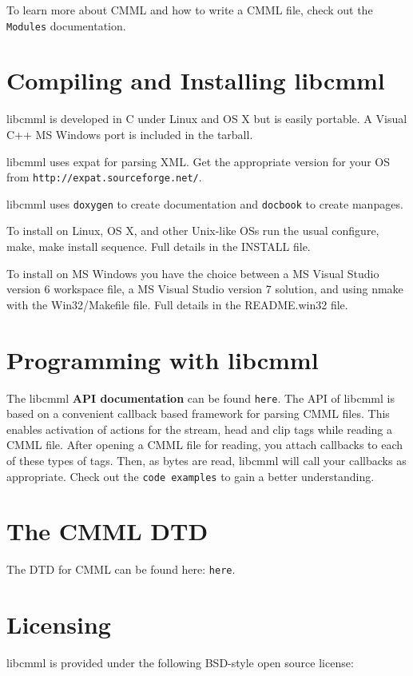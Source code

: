 To learn more about CMML and how to write a CMML file, check out the {\tt Modules} documentation.\section{Compiling and Installing libcmml}\label{install}
libcmml is developed in C under Linux and OS X but is easily portable. A Visual C++ MS Windows port is included in the tarball.

libcmml uses expat for parsing XML. Get the appropriate version for your OS from {\tt http://expat.sourceforge.net/}.

libcmml uses {\tt doxygen} to create documentation and {\tt docbook} to create manpages.

To install on Linux, OS X, and other Unix-like OSs run the usual configure, make, make install sequence. Full details in the INSTALL file.

To install on MS Windows you have the choice between a MS Visual Studio version 6 workspace file, a MS Visual Studio version 7 solution, and using nmake with the Win32/Makefile file. Full details in the README.win32 file.\section{Programming with libcmml}\label{begin}
The libcmml {\bf API documentation} can be found {\tt here}. The API of libcmml is based on a convenient callback based framework for parsing CMML files. This enables activation of actions for the stream, head and clip tags while reading a CMML file. After opening a CMML file for reading, you attach callbacks to each of these types of tags. Then, as bytes are read, libcmml will call your callbacks as appropriate. Check out the {\tt code examples} to gain a better understanding.\section{The CMML DTD}\label{dtd}
The DTD for CMML can be found here: {\tt here}.\section{Licensing}\label{license}
libcmml is provided under the following BSD-style open source license:



